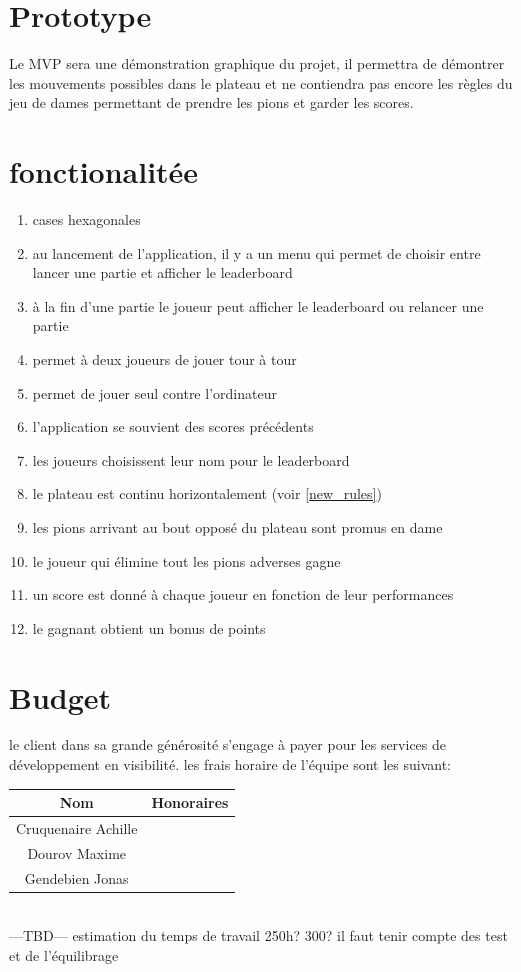 \documentclass{article}
\begin{document}
\section{Prototype}
Le MVP sera une démonstration graphique du projet, il permettra de démontrer les mouvements possibles dans le plateau et ne contiendra pas encore les règles du jeu de dames permettant de prendre les pions et garder les scores.

\section{fonctionalitée}
\begin{enumerate}
    \item cases hexagonales
    \item au lancement de l'application, il y a un menu qui permet de choisir entre lancer une partie et afficher le leaderboard
    \item à la fin d'une partie le joueur peut afficher le leaderboard ou relancer une partie
    \item permet à deux joueurs de jouer tour à tour
    \item permet de jouer seul contre l'ordinateur
    \item l'application se souvient des scores précédents
    \item les joueurs choisissent leur nom pour le leaderboard
    \item le plateau est continu horizontalement (voir \ref{new_rules})
    \item les pions arrivant au bout opposé du plateau sont promus en dame
    \item le joueur qui élimine tout les pions adverses gagne
    \item un score est donné à chaque joueur en fonction de leur performances
    \item le gagnant obtient un bonus de points
\end{enumerate}

\section{Budget}
le client dans sa grande générosité s'engage à payer pour les services de développement en visibilité.
les frais horaire de l'équipe sont les suivant:
\begin{table}[h]
    \begin{tabular}{c|c}
    \toprule
        Nom & Honoraires \\
    \midrule
        Cruquenaire Achille &  \\
        Dourov Maxime & \\
        Gendebien Jonas & \\
    \bottomrule
    \end{tabular}
\end{table}\\
---TBD--- estimation du temps de travail 250h? 300?
il faut tenir compte des test et de l'équilibrage
\end{document}
